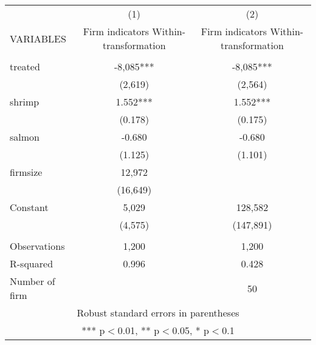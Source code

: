 \begin{tabular}{lcc} \hline
 & (1) & (2) \\
VARIABLES & Firm indicators Within-transformation & Firm indicators Within-transformation \\ \hline
 &  &  \\
treated & -8,085*** & -8,085*** \\
 & (2,619) & (2,564) \\
shrimp & 1.552*** & 1.552*** \\
 & (0.178) & (0.175) \\
salmon & -0.680 & -0.680 \\
 & (1.125) & (1.101) \\
firmsize & 12,972 &  \\
 & (16,649) &  \\
Constant & 5,029 & 128,582 \\
 & (4,575) & (147,891) \\
 &  &  \\
Observations & 1,200 & 1,200 \\
R-squared & 0.996 & 0.428 \\
 Number of firm &  & 50 \\ \hline
\multicolumn{3}{c}{ Robust standard errors in parentheses} \\
\multicolumn{3}{c}{ *** p$<$0.01, ** p$<$0.05, * p$<$0.1} \\
\end{tabular}
